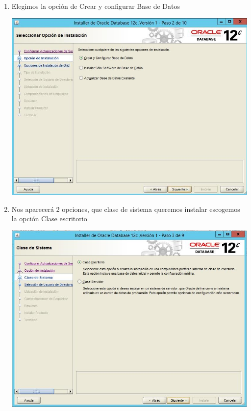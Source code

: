 \begin{enumerate}[1.]
	\item Elegimos la opci\'on de Crear y configurar Base de Datos\\
	\begin{center}
	\includegraphics[width=15cm]{./Imagenes/img14} 
	\end{center}

	\item Nos aparecer\'a 2 opciones, que clase de sistema queremos instalar escogemos la opci\'on Clase escritorio\\
	\begin{center}
	\includegraphics[width=15cm]{./Imagenes/img15} 
	\end{center}


\end{enumerate}
